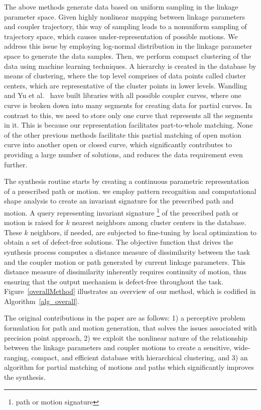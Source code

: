 \documentclass[twocolumn,10pt]{asme2ej}
\begin{document}
The above methods generate data based on uniform sampling in the linkage parameter space.
Given highly nonlinear mapping between linkage parameters and coupler trajectory, this way of sampling leads to a nonuniform sampling of trajectory space, which causes under-representation of possible motions.
We address this issue by employing log-normal distribution in the linkage parameter space to generate the data samples.
Then, we perform compact clustering of the data using machine learning techniques.
A hierarchy is created in the database by means of clustering, where the top level comprises of data points called cluster centers, which are representative of the cluster points in lower levels.
Wandling~\cite{wandling2000} and Yu et al.~\cite{yue-pathgen2011} have built libraries with all possible coupler curves, where one curve is broken down into many segments for creating data for partial curves.
In contrast to this, we need to store only one curve that represents all the segments in it.
This is because our representation facilitates part-to-whole matching.
None of the other previous methods facilitate this partial matching of open motion curve into another open or closed curve, which significantly contributes to providing a large number of solutions, and reduces the data requirement even further.

The synthesis routine starts by creating a continuous parametric representation of a prescribed path or motion.
we employ pattern recognition and computational shape analysis to create an invariant signature for the prescribed path and motion.
A query representing invariant signature \footnote{path or motion signature} of the prescribed path or motion is raised for $k$ nearest neighbors among cluster centers in the database.
These $k$ neighbors, if needed, are subjected to fine-tuning by local optimization to obtain a set of defect-free solutions.
The objective function that drives the synthesis process computes a distance measure of dissimilarity between the task and the coupler motion or path generated by current linkage parameters.
This distance measure of dissimilarity inherently requires continuity of motion, thus ensuring that the output mechanism is defect-free throughout the task.
Figure~\ref{overallMethod} illustrates an overview of our method, which is codified in Algorithm~\ref{alg_overall}.

The original contributions in the paper are as follows:
1) a perceptive problem formulation for path and motion generation, that solves the issues associated with precision point approach,
2) we exploit the nonlinear nature of the relationship between the linkage parameters and coupler motions to create a sensitive, wide-ranging, compact, and efficient database with hierarchical clustering, and 3) an algorithm for partial matching of motions and paths which significantly improves the synthesis.
\end{document}
